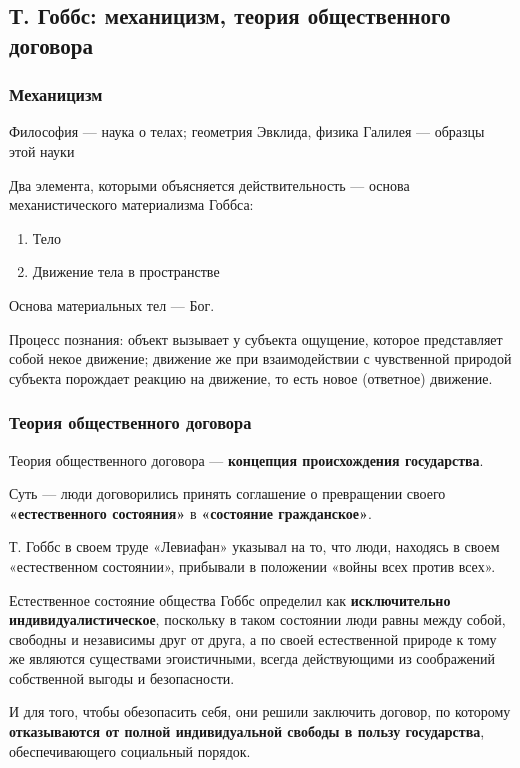 \documentclass{article}
\begin{document}
\begin{flushleft}
\subsection{Т. Гоббс: механицизм, теория общественного договора}

\subsubsection{Механицизм}

Философия — наука о телах; геометрия Эвклида, физика Галилея — образцы этой науки

Два элемента, которыми объясняется действительность — основа механистического материализма Гоббса:

\begin{enumerate}
    \item Тело
    \item Движение тела в пространстве
\end{enumerate}

Основа материальных тел — Бог.

Процесс познания: объект вызывает у субъекта ощущение, которое представляет собой некое движение; движение же при взаимодействии с чувственной природой субъекта порождает реакцию на движение, то есть новое (ответное) движение.

\subsubsection{Теория общественного договора}

Теория общественного договора — \textbf{концепция происхождения государства}.

Суть — люди договорились принять соглашение о превращении своего \textbf{«естественного состояния»} в \textbf{«состояние гражданское»}. 

\hfill

Т. Гоббс  в своем труде «Левиафан» указывал на то, что люди, находясь в своем «естественном состоянии», прибывали в положении «войны всех против всех».

Естественное состояние общества Гоббс определил как \textbf{исключительно индивидуалистическое}, поскольку в  таком  состоянии люди  равны  между  собой,  свободны  и  независимы  друг от  друга, а  по  своей естественной природе  к  тому  же являются  существами  эгоистичными,  всегда  действующими  из соображений собственной выгоды и безопасности.

И для того, чтобы обезопасить себя, они решили заключить договор, по которому \textbf{отказываются от полной индивидуальной свободы в пользу государства}, обеспечивающего социальный порядок.


\end{flushleft}
\end{document}
